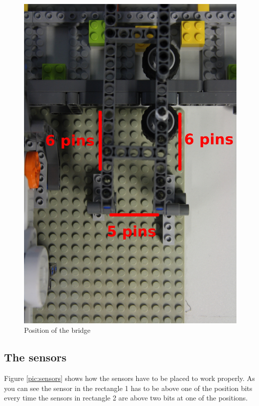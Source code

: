 \documentclass[%
  a4paper,%
  11pt,%
  blue,%
  hyperref	%
  ]{tubsartcl}
\begin{document}
\begin{figure}[!htb]
\begin{center}
\includegraphics[scale=0.35]{graphics_lego/bridge1.jpg}
\end{center}
\caption{Position of the bridge}
\label{pic:bridge1}
\end{figure}

\newpage

\subsection{The sensors}

Figure \ref{pic:sensors} shows how the sensors have to be placed to work properly. As you can see the sensor in the rectangle 1 has to be above one of the position bits every time the sensors in rectangle 2 are above two bits at one of the positions.
\end{document}
